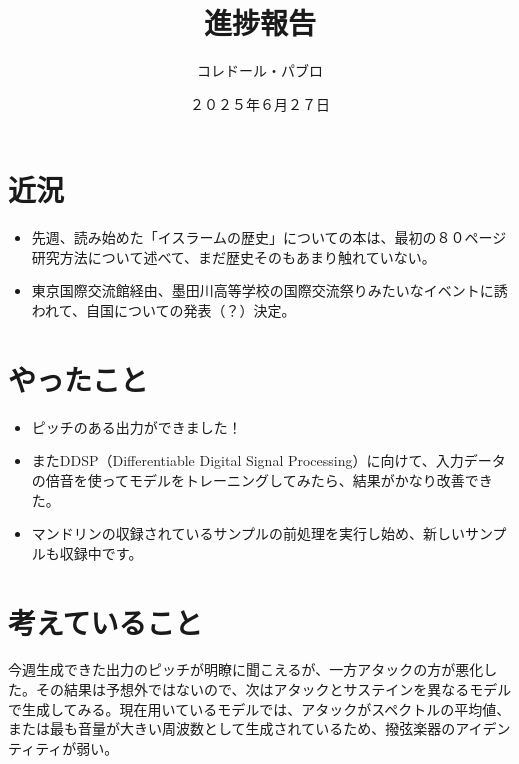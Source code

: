 \documentclass[a4paper, 12pt]{article}
\title{進捗報告}
\author{コレドール・パブロ}
\date{２０２５年６月２７日}
\begin{document}
\maketitle

\section*{近況}
\begin{itemize}
    \item 先週、読み始めた「イスラームの歴史」についての本は、最初の８０ページ研究方法について述べて、まだ歴史そのもあまり触れていない。
    \item 東京国際交流館経由、墨田川高等学校の国際交流祭りみたいなイベントに誘われて、自国についての発表（？）決定。
\end{itemize} 

\section*{やったこと}
\begin{itemize}
    \item ピッチのある出力ができました！
    \item またDDSP（Differentiable Digital Signal Processing）\cite{DDSP_Traditional}に向けて、入力データの倍音を使ってモデルをトレーニングしてみたら、結果がかなり改善できた。
    \item マンドリンの収録されているサンプルの前処理を実行し始め、新しいサンプルも収録中です。
\end{itemize}

\section*{考えていること}

今週生成できた出力のピッチが明瞭に聞こえるが、一方アタックの方が悪化した。その結果は予想外ではないので、次はアタックとサステインを異なるモデルで生成してみる。現在用いているモデルでは、アタックがスペクトルの平均値、または最も音量が大きい周波数として生成されているため、撥弦楽器のアイデンティティが弱い。

\end{document}
